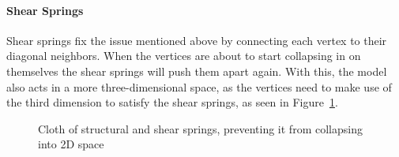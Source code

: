 \paragraph{Shear Springs}
Shear springs fix the issue mentioned above by connecting each vertex to their diagonal neighbors.
When the vertices are about to start collapsing in on themselves the shear springs will push them apart again\cite{jeff_lander_real_time_cloth}.
With this, the model also acts in a more three-dimensional space, as the vertices need to make use of the third dimension to satisfy the shear springs, as seen in Figure~\ref{fig:shear_springs_collapsing}.
\begin{figure}
    \centering
    \caption{Cloth of structural and shear springs, preventing it from collapsing into 2D space}
    \label{fig:shear_springs_collapsing}
\end{figure}

